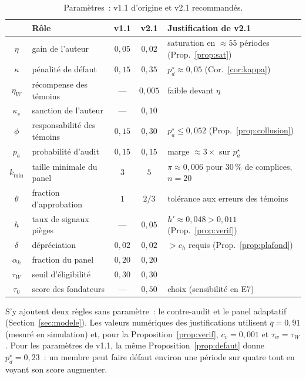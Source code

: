 \documentclass[11pt,a4paper]{article}
\theoremstyle{plain}
\theoremstyle{definition}
\theoremstyle{remark}
\newcommand{\1}{\mathbf{1}}
\begin{document}
\begin{table}[h]
\centering
\caption{Paramètres~: v1.1 d'origine et v2.1 recommandés.}
\label{tab:params}
\small
\begin{tabular}{clccl}
\toprule
& Rôle & v1.1 & v2.1 & Justification de v2.1 \\
\midrule
$\eta$ & gain de l'auteur & $0{,}05$ & $0{,}02$ & saturation en $\approx55$ périodes (Prop.~\ref{prop:sat}) \\
$\kappa$ & pénalité de défaut & $0{,}15$ & $0{,}35$ & $p^\star_d\approx0{,}05$ (Cor.~\ref{cor:kappa}) \\
$\eta_W$ & récompense des témoins & --- & $0{,}005$ & faible devant $\eta$ \\
$\kappa_s$ & sanction de l'auteur & --- & $0{,}10$ & \\
$\phi$ & responsabilité des témoins & $0{,}15$ & $0{,}30$ & $p^\star_a\le0{,}052$ (Prop.~\ref{prop:collusion}) \\
$p_a$ & probabilité d'audit & $0{,}15$ & $0{,}15$ & marge $\approx3\times$ sur $p^\star_a$ \\
$k_{\min}$ & taille minimale du panel & $3$ & $5$ & $\pi\approx0{,}006$ pour 30\,\% de complices, $n=20$ \\
$\theta$ & fraction d'approbation & $1$ & $2/3$ & tolérance aux erreurs des témoins \\
$h$ & taux de signaux pièges & --- & $0{,}05$ & $h'\approx0{,}048>0{,}011$ (Prop.~\ref{prop:verif}) \\
$\delta$ & dépréciation & $0{,}02$ & $0{,}02$ & $>c_h$ requis (Prop.~\ref{prop:plafond}) \\
$\alpha_k$ & fraction du panel & $0{,}20$ & $0{,}20$ & \\
$\tau_W$ & seuil d'éligibilité & $0{,}30$ & $0{,}30$ & \\
$\tau_0$ & score des fondateurs & --- & $0{,}50$ & choix (sensibilité en E7) \\
\bottomrule
\end{tabular}
\end{table}

S'y ajoutent deux règles sans paramètre~: le contre-audit et le panel adaptatif
(Section~\ref{sec:modele}). Les valeurs numériques des justifications utilisent $\bar q=0{,}91$ (mesuré en
simulation) et, pour la Proposition~\ref{prop:verif}, $c_v=0{,}001$ et
$\tau_w=\tau_W$. Pour les paramètres de v1.1, la même
Proposition~\ref{prop:defaut} donne $p^\star_d=0{,}23$~: un membre peut faire défaut
environ une période sur quatre tout en voyant son score augmenter.
\end{document}
